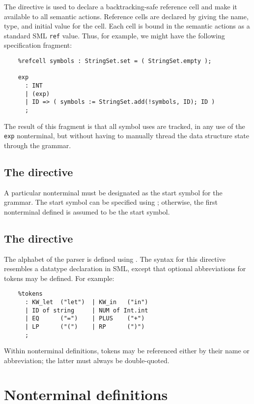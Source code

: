 The  directive is used to declare a backtracking-safe reference cell and make it available to all semantic actions.  Reference cells are declared by giving the name, type, and initial value for the cell.  Each cell is bound in the semantic actions as a standard SML {\tt ref} value.  Thus, for example, we might have the following specification fragment:
\begin{verbatim}
    %refcell symbols : StringSet.set = ( StringSet.empty );
    
    exp
      : INT
      | (exp)
      | ID => ( symbols := StringSet.add(!symbols, ID); ID )
      ;
\end{verbatim}
The result of this fragment is that all symbol uses are tracked, in any use of the {\tt exp} nonterminal, but without having to manually thread the data structure state through the grammar.

\subsection{The  directive}\label{sec:start}

A particular nonterminal must be designated as the start symbol for the grammar.  The start symbol can be specified using ; otherwise, the first nonterminal defined is assumed to be the start symbol.

\subsection{The  directive}

The alphabet of the parser is defined using .  The syntax for this directive resembles a datatype declaration in SML, except that optional abbreviations for tokens may be defined.  For example:
\begin{verbatim}
    %tokens
      : KW_let  ("let")  | KW_in   ("in")
      | ID of string     | NUM of Int.int
      | EQ      ("=")    | PLUS    ("+")
      | LP      ("(")    | RP      (")")
      ;
\end{verbatim}
Within nonterminal definitions, tokens may be referenced either by their name or abbreviation; the latter must always be double-quoted.

\section{Nonterminal definitions}\label{sec:antlr-nt}

